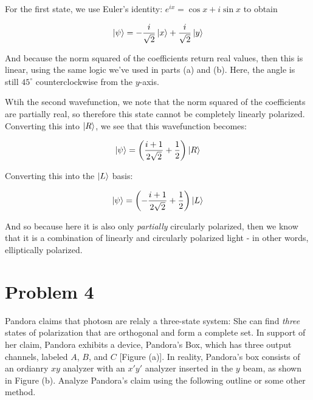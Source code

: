 \documentclass[10pt]{article}
\begin{document}
\begin{enumerate}[(a)]
        \begin{solution}
            For the first state, we use Euler's identity: $e^{ix} = \cos x + i \sin x$ to obtain

            \[ \ket \psi = -\frac{i}{\sqrt 2} \ket x + \frac{i}{\sqrt 2}\ket y\] 

            And because the norm squared of the coefficients return real values, then this is linear, using the same logic we've used in parts (a) and (b). Here, the angle is still $45^\circ$ counterclockwise from the $y$-axis. 

            Wtih the second wavefunction, we note that the norm squared of the coefficients are partially real, so therefore this state cannot be completely linearly polarized. Converting this into $\ket R$, we see that this wavefunction becomes: 

            \[ \ket \psi = \left(\frac{i+1}{2\sqrt{2}} + \frac{1}{2}\right) \ket R\] 

            Converting this into the $\ket L$ basis: 

            \[ \ket \psi = \left(-\frac{i+1}{2\sqrt{2}} + \frac{1}{2}\right) \ket L\] 

            And so because here it is also only \textit{partially} circularly polarized, then we know that it is a combination of linearly and circularly polarized light - in other words, elliptically polarized.
        \end{solution}

    \end{enumerate}


    \pagebreak 

    \section*{Problem 4}

    Pandora claims that photosn are relaly a three-state system: She can find \textit{three} states of polarization that are orthogonal and form a complete set. In support of her claim, Pandora exhibits a device, Pandora's Box, which has three output channels, labeled $A$, $B$, and $C$ [Figure (a)]. In reality, Pandora's box consists of an ordianry $xy$ analyzer with an $x'y'$ analyzer inserted in the $y$ beam, as shown in Figure (b). Analyze Pandora's claim using the following outline or some other method. 
\end{document}
